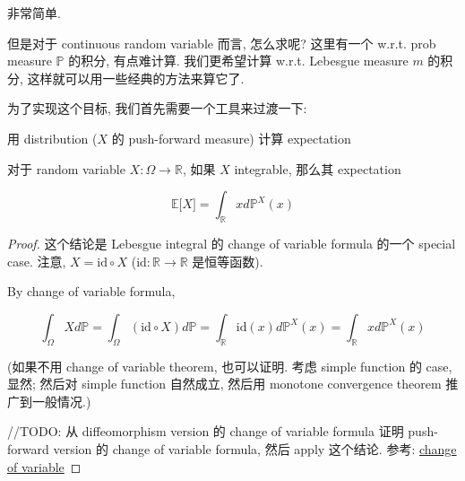 \documentclass{qlnotes-export}
\begin{document}
非常简单.

但是对于 continuous random variable 而言, 怎么求呢? 这里有一个 w.r.t. prob measure \(\mathbb{P}\) 的积分, 有点难计算. 我们更希望计算 w.r.t. Lebesgue measure \(m\) 的积分, 这样就可以用一些经典的方法来算它了.

为了实现这个目标, 我们首先需要一个工具来过渡一下:

\begin{lemma}{用 distribution (\(X\) 的 push-forward measure) 计算 expectation}\label{lem-02-random-variables-distribution-x-push-forward-measure-expectation}

对于 random variable \(X:\Omega\rightarrow{\mathbb{R}}\), 如果 \(X\) integrable, 那么其 expectation

\[{\mathbb{E}}\lbrack X\rbrack = \int_{\mathbb{R}}x d{\mathbb{P}}^{X}(x)\]

\end{lemma}

\begin{proof}

这个结论是 Lebesgue integral 的 change of variable formula 的一个 special case. 注意, \(X = \text{id} \circ X\) (\(\text{id}:{\mathbb{R}}\rightarrow{\mathbb{R}}\) 是恒等函数).

By change of variable formula,

\[\int_{\Omega}X d{\mathbb{P}} = \int_{\Omega}(\text{id} \circ X) d{\mathbb{P}} = \int_{\mathbb{R}}\text{id}(x) d{\mathbb{P}}^{X}(x) = \int_{\mathbb{R}}x d{\mathbb{P}}^{X}(x)\]

(如果不用 change of variable theorem, 也可以证明. 考虑 simple function 的 case, 显然; 然后对 simple function 自然成立, 然后用 monotone convergence theorem 推广到一般情况.)

//TODO: 从 diffeomorphism version 的 change of variable formula 证明 push-forward version 的 change of variable formula, 然后 apply 这个结论. 参考: \href{https://en.wikipedia.org/wiki/Change_of_variables}{change of variable}

\end{proof}
\end{document}
